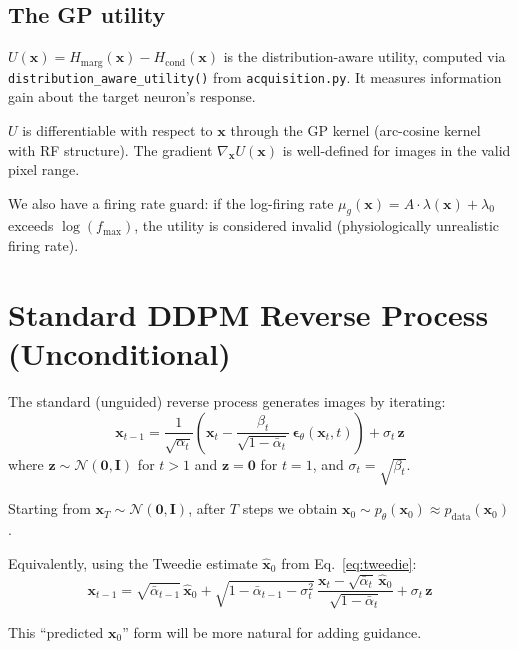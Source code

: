 \documentclass[11pt]{article}
\newcommand{\xb}{\mathbf{x}}
\newcommand{\zb}{\mathbf{z}}
\newcommand{\eb}{\boldsymbol{\epsilon}}
\newcommand{\Ib}{\mathbf{I}}
\newcommand{\alphabar}{\bar{\alpha}}
\begin{document}
\subsection{The GP utility}

$U(\xb) = H_{\text{marg}}(\xb) - H_{\text{cond}}(\xb)$ is the distribution-aware
utility, computed via \texttt{distribution\_aware\_utility()} from \texttt{acquisition.py}.
It measures information gain about the target neuron's response.

$U$ is differentiable with respect to $\xb$ through the GP kernel (arc-cosine kernel
with RF structure). The gradient $\nabla_\xb U(\xb)$ is well-defined for
images in the valid pixel range.

We also have a firing rate guard: if the log-firing rate $\mu_g(\xb) = A \cdot \lambda(\xb) + \lambda_0$
exceeds $\log(f_{\max})$, the utility is considered invalid (physiologically unrealistic firing rate).

\section{Standard DDPM Reverse Process (Unconditional)}

The standard (unguided) reverse process generates images by iterating:
\begin{equation}
    \xb_{t-1} = \frac{1}{\sqrt{\alpha_t}}
    \left(\xb_t - \frac{\beta_t}{\sqrt{1 - \alphabar_t}}\, \eb_\theta(\xb_t, t)\right)
    + \sigma_t\, \zb
    \label{eq:ddpm_reverse}
\end{equation}
where $\zb \sim \mathcal{N}(\mathbf{0}, \Ib)$ for $t > 1$ and $\zb = \mathbf{0}$ for $t = 1$,
and $\sigma_t = \sqrt{\beta_t}$.

Starting from $\xb_T \sim \mathcal{N}(\mathbf{0}, \Ib)$, after $T$ steps we obtain
$\xb_0 \sim p_\theta(\xb_0) \approx p_{\text{data}}(\xb_0)$.

Equivalently, using the Tweedie estimate $\hat{\xb}_0$ from Eq.~\eqref{eq:tweedie}:
\begin{equation}
    \xb_{t-1} = \sqrt{\alphabar_{t-1}}\, \hat{\xb}_0
    + \sqrt{1 - \alphabar_{t-1} - \sigma_t^2}\,
    \frac{\xb_t - \sqrt{\alphabar_t}\, \hat{\xb}_0}{\sqrt{1 - \alphabar_t}}
    + \sigma_t\, \zb
    \label{eq:ddpm_reverse_x0}
\end{equation}

This ``predicted $\xb_0$'' form will be more natural for adding guidance.
\end{document}

